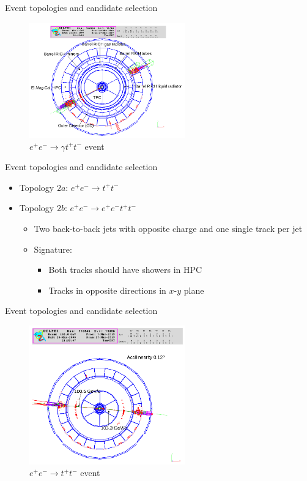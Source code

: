 \documentclass{beamer}
\begin{document}
\begin{frame}{Event topologies and candidate selection}
  \begin{figure}
    \centering
    \includegraphics[width = 0.6\textwidth]{Topology1.png}
    \caption{$e^+e^-\to \gamma t^+t^-$ event}
  \end{figure}
\end{frame}

\begin{frame}{Event topologies and candidate selection}
  \begin{itemize}
    \item{Topology $2a$: $e^+e^-\to t^+t^-$}
    \item{Topology $2b$: $e^+e^-\to e^+e^-t^+t^-$}
    \begin{itemize}
      \item{Two back-to-back jets with opposite charge and one single track per jet}
      \item{Signature:}
      \begin{itemize}
        \item{Both tracks should have showers in HPC}
        \item{Tracks in opposite directions in $x$-$y$ plane}
      \end{itemize}
    \end{itemize}
  \end{itemize}
\end{frame}

\begin{frame}{Event topologies and candidate selection}
  \begin{figure}
    \centering
    \includegraphics[width = 0.6\textwidth]{Topology2.png}
    \caption{$e^+e^-\to t^+t^-$ event}
  \end{figure}
\end{frame}
\end{document}
